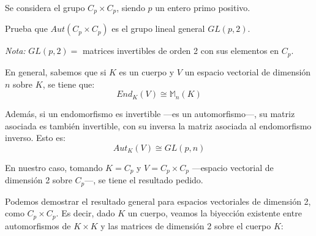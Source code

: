 \documentclass[a4paper, 11pt]{article}
\begin{document}
  \maketitle
  \begin{ejercicio}
      Se considera el grupo $C_p \times C_p$, siendo $p$ un entero primo positivo.
  \end{ejercicio}

  \begin{apartado}
      Prueba que $Aut(C_p \times C_p)$ es el grupo lineal general $GL(p,2)$.
  \end{apartado}

  \begin{solucion}
      \emph{Nota: } $GL(p,2) =$ matrices invertibles de orden 2 con sus elementos en $C_p$.

      En general, sabemos que si $K$ es un cuerpo y $V$ un espacio vectorial de dimensión $n$ sobre $K$, se tiene que:
      \[
      End_K(V) \cong \mathbb{M}_n(K)
      \]

      Además, si un endomorfismo es invertible ---es un automorfismo---, su matriz asociada es también invertible, con su inversa la matriz asociada al endomorfismo inverso. Esto es:
      \[
      Aut_K(V) \cong GL(p,n)
      \]

      En nuestro caso, tomando $K=C_p$ y $V=C_p \times C_p$ ---espacio vectorial de dimensión 2 sobre $C_p$---, se tiene el resultado pedido.

      Podemos demostrar el resultado general para espacios vectoriales de dimensión 2, como $C_p \times C_p$. Es decir, dado $K$ un cuerpo, veamos la biyección existente entre automorfismos de $K \times K$ y las matrices de dimensión 2 sobre el cuerpo $K$:


\end{solucion}
\end{document}
